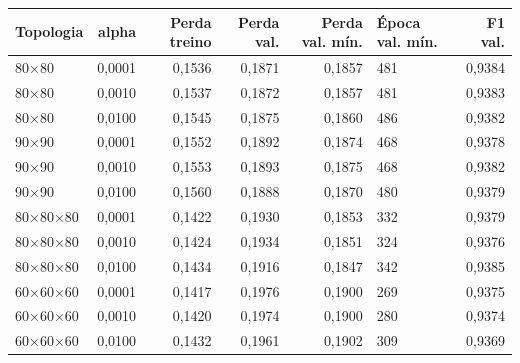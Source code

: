 \begin{tabular}{lrrrrlr}
\toprule
Topologia & alpha & Perda treino & Perda val. & Perda val. mín. & Época val. mín. & F1 val. \\
\midrule
80×80 & 0,0001 & 0,1536 & 0,1871 & 0,1857 & 481 & 0,9384 \\
80×80 & 0,0010 & 0,1537 & 0,1872 & 0,1857 & 481 & 0,9383 \\
80×80 & 0,0100 & 0,1545 & 0,1875 & 0,1860 & 486 & 0,9382 \\
90×90 & 0,0001 & 0,1552 & 0,1892 & 0,1874 & 468 & 0,9378 \\
90×90 & 0,0010 & 0,1553 & 0,1893 & 0,1875 & 468 & 0,9382 \\
90×90 & 0,0100 & 0,1560 & 0,1888 & 0,1870 & 480 & 0,9379 \\
80×80×80 & 0,0001 & 0,1422 & 0,1930 & 0,1853 & 332 & 0,9379 \\
80×80×80 & 0,0010 & 0,1424 & 0,1934 & 0,1851 & 324 & 0,9376 \\
80×80×80 & 0,0100 & 0,1434 & 0,1916 & 0,1847 & 342 & 0,9385 \\
60×60×60 & 0,0001 & 0,1417 & 0,1976 & 0,1900 & 269 & 0,9375 \\
60×60×60 & 0,0010 & 0,1420 & 0,1974 & 0,1900 & 280 & 0,9374 \\
60×60×60 & 0,0100 & 0,1432 & 0,1961 & 0,1902 & 309 & 0,9369 \\
\bottomrule
\end{tabular}
